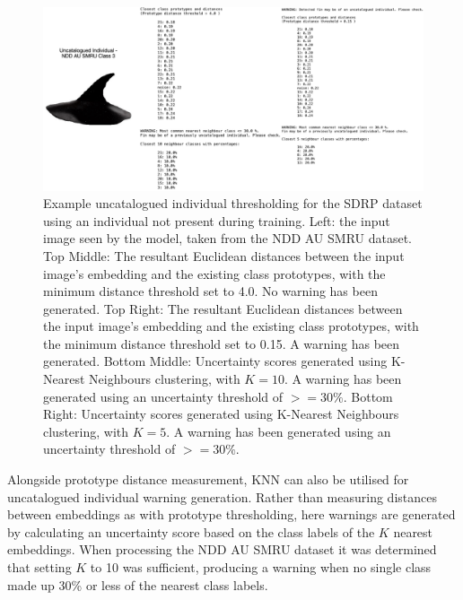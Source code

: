 \begin{figure}[t]
	\begin{center}
		\includegraphics[width=0.9\linewidth]{Chapter7/figs/uncatalogued-individual-thresholding-updated.png}
	\end{center}
	\caption[Example uncatalogued individual thresholding for the SDRP dataset using an individual not present during training.]{Example uncatalogued individual thresholding for the SDRP dataset using an individual not present during training. Left: the input image seen by the model, taken from the NDD AU SMRU dataset.  Top Middle: The resultant Euclidean distances between the input image's embedding and the existing class prototypes, with the minimum distance threshold set to 4.0. No warning has been generated. Top Right: The resultant Euclidean distances between the input image's embedding and the existing class prototypes, with the minimum distance threshold set to 0.15. A warning has been generated. Bottom Middle: Uncertainty scores generated using K-Nearest Neighbours clustering, with $K = 10$. A warning has been generated using an uncertainty threshold of $>=30\%$. Bottom Right: Uncertainty scores generated using K-Nearest Neighbours clustering, with $K = 5$. A warning has been generated using an uncertainty threshold of $>=30\%$.}
	\label{fig:uncatalogued-individual-example-sdrp}
\end{figure}

Alongside prototype distance measurement, KNN can also be utilised for uncatalogued individual warning generation. Rather than measuring distances between embeddings as with prototype thresholding, here warnings are generated by calculating an uncertainty score based on the class labels of the $K$ nearest embeddings. When processing the NDD AU SMRU dataset it was determined that setting $K$ to 10 was sufficient, producing a warning when no single class made up 30\% or less of the nearest class labels. 

